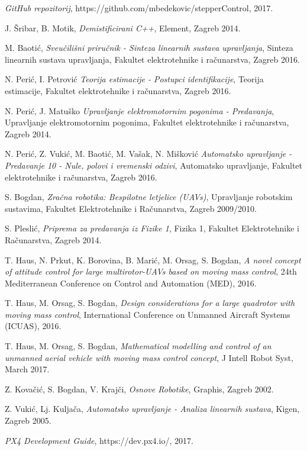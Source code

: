 \documentclass[11pt,a4paper]{article}
\begin{document}

\begin{thebibliography}{9}
	
  \emph{GitHub repozitorij}, https://github.com/mbedekovic/stepperControl,
  2017.
 
 J. Šribar, B. Motik,
 \emph{Demistificirani C++},
 Element,
 Zagreb 2014.
 
  M. Baotić,
  \emph{Sveučilišni priručnik - Sinteza linearnih sustava upravljanja},
  Sinteza linearnih sustava upravljanja, Fakultet elektrotehnike i računarstva,
  Zagreb 2016. 
  
  N. Perić, I. Petrović
  \emph{Teorija estimacije - Postupci identifikacije},
  Teorija estimacije, Fakultet elektrotehnike i računarstva,
  Zagreb 2016. 
  
  N. Perić, J. Matuško
  \emph{Upravljanje elektromotornim pogonima - Predavanja},
  Upravljanje elektromotornim pogonima, Fakultet elektrotehnike i računarstva,
  Zagreb 2014. 
  
  N. Perić, Z. Vukić, M. Baotić, M. Vašak, N. Mišković
  \emph{Automatsko upravljanje - Predavanje 10 - Nule, polovi i vremenski odzivi},
  Automatsko upravljanje, Fakultet elektrotehnike i računarstva,
  Zagreb 2016.  
  
  S. Bogdan,
  \emph{Zračna robotika: Bespilotne letjelice (UAVs)},
  Upravljanje robotskim sustavima, Fakultet Elektrotehnike i Računarstva,
  Zagreb 2009/2010.
  
  S. Pleslić,
  \emph{Priprema za predavanja iz Fizike 1},
  Fizika 1, Fakultet Elektrotehnike i Računarstva,
  Zagreb 2014.
  
  T. Haus, N. Prkut, K. Borovina, B. Marić, M. Orsag, S. Bogdan,
  \emph{A novel concept of attitude control for large multirotor-UAVs based on moving mass control},
  24th Mediterranean Conference on Control and Automation (MED),
  2016.
  
  T. Haus, M. Orsag, S. Bogdan,
  \emph{Design considerations for a large quadrotor with moving mass control},
  International Conference on Unmanned Aircraft Systems (ICUAS),
  2016.
 
  T. Haus, M. Orsag, S. Bogdan,
  \emph{Mathematical modelling and control of an unmanned aerial vehicle with moving mass control concept},
  J Intell Robot Syst,
  March 2017. 
  
  Z. Kovačić, S. Bogdan, V. Krajči,
  \emph{Osnove Robotike},
  Graphis,
  Zagreb 2002.
 
  Z. Vukić, Lj. Kuljača,
  \emph{Automatsko upravljanje - Analiza linearnih sustava},
  Kigen,
  Zagreb 2005.
  
  \emph{PX4 Development Guide}, https://dev.px4.io/,
  2017.

  
  
\end{thebibliography}
\end{document}
